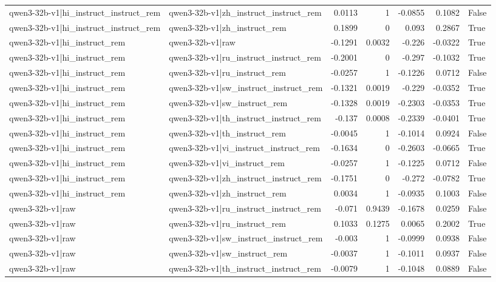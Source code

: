 \begin{table}
\begin{tabular}{l l r r r r l}
qwen3-32b-v1|hi_instruct_instruct_rem & qwen3-32b-v1|zh_instruct_instruct_rem & 0.0113 & 1 & -0.0855 & 0.1082 & False \\
qwen3-32b-v1|hi_instruct_instruct_rem & qwen3-32b-v1|zh_instruct_rem & 0.1899 & 0 & 0.093 & 0.2867 & True \\
qwen3-32b-v1|hi_instruct_rem & qwen3-32b-v1|raw & -0.1291 & 0.0032 & -0.226 & -0.0322 & True \\
qwen3-32b-v1|hi_instruct_rem & qwen3-32b-v1|ru_instruct_instruct_rem & -0.2001 & 0 & -0.297 & -0.1032 & True \\
qwen3-32b-v1|hi_instruct_rem & qwen3-32b-v1|ru_instruct_rem & -0.0257 & 1 & -0.1226 & 0.0712 & False \\
qwen3-32b-v1|hi_instruct_rem & qwen3-32b-v1|sw_instruct_instruct_rem & -0.1321 & 0.0019 & -0.229 & -0.0352 & True \\
qwen3-32b-v1|hi_instruct_rem & qwen3-32b-v1|sw_instruct_rem & -0.1328 & 0.0019 & -0.2303 & -0.0353 & True \\
qwen3-32b-v1|hi_instruct_rem & qwen3-32b-v1|th_instruct_instruct_rem & -0.137 & 0.0008 & -0.2339 & -0.0401 & True \\
qwen3-32b-v1|hi_instruct_rem & qwen3-32b-v1|th_instruct_rem & -0.0045 & 1 & -0.1014 & 0.0924 & False \\
qwen3-32b-v1|hi_instruct_rem & qwen3-32b-v1|vi_instruct_instruct_rem & -0.1634 & 0 & -0.2603 & -0.0665 & True \\
qwen3-32b-v1|hi_instruct_rem & qwen3-32b-v1|vi_instruct_rem & -0.0257 & 1 & -0.1225 & 0.0712 & False \\
qwen3-32b-v1|hi_instruct_rem & qwen3-32b-v1|zh_instruct_instruct_rem & -0.1751 & 0 & -0.272 & -0.0782 & True \\
qwen3-32b-v1|hi_instruct_rem & qwen3-32b-v1|zh_instruct_rem & 0.0034 & 1 & -0.0935 & 0.1003 & False \\
qwen3-32b-v1|raw & qwen3-32b-v1|ru_instruct_instruct_rem & -0.071 & 0.9439 & -0.1678 & 0.0259 & False \\
qwen3-32b-v1|raw & qwen3-32b-v1|ru_instruct_rem & 0.1033 & 0.1275 & 0.0065 & 0.2002 & True \\
qwen3-32b-v1|raw & qwen3-32b-v1|sw_instruct_instruct_rem & -0.003 & 1 & -0.0999 & 0.0938 & False \\
qwen3-32b-v1|raw & qwen3-32b-v1|sw_instruct_rem & -0.0037 & 1 & -0.1011 & 0.0937 & False \\
qwen3-32b-v1|raw & qwen3-32b-v1|th_instruct_instruct_rem & -0.0079 & 1 & -0.1048 & 0.0889 & False \\

\end{tabular}
\end{table}
